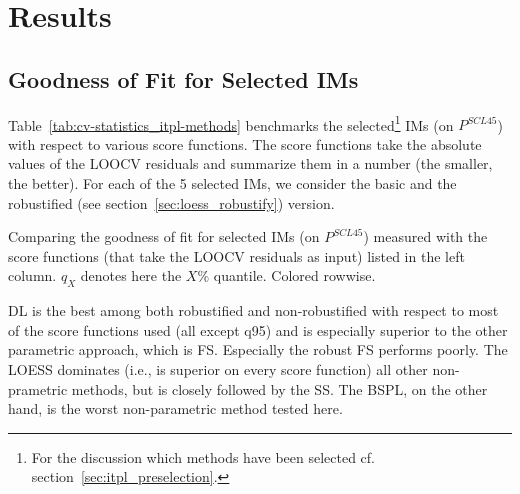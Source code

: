 \chapter{Results}\label{sec:results}

\section{Goodness of Fit for Selected {{IM}}s}{
	\label{sec:results_itpl}
	Table~\ref{tab:cv-statistics_itpl-methods} benchmarks the selected\footnote{\label{note:selected-IM} For the discussion which methods have been selected cf. section~\ref{sec:itpl_preselection}.} {{IM}}s (on $P^{SCL45}$) with respect to various score functions. The score functions take the absolute values of the LOOCV residuals and summarize them in a number (the smaller, the better). For each of the 5 selected {{IM}}s, we consider the basic and the robustified (see section~\ref{sec:loess_robustify}) version.

	\begin{table}[h]
		\begin{center}
			\caption[Goodness of fit for {{IM}}s (on $P^{SCL45}$) measured with the score functions.]{Comparing the goodness of fit for selected {{IM}}s (on $P^{SCL45}$) measured with the score functions (that take the LOOCV residuals as input) listed in the left column. $q_X$ denotes here the $X\%$ quantile. Colored rowwise.}
			\scriptsize
			
			\normalsize
			\label{tab:cv-statistics_itpl-methods}
		\end{center}
	\end{table}
	
	DL is the best among both robustified and non-robustified with respect to most of the score functions used (all except q95) and is especially superior to the other parametric approach, which is FS. Especially the robust FS performs poorly. The LOESS dominates (i.e., is superior on every score function) all other non-prametric methods, but is closely followed by the SS. The BSPL, on the other hand, is the worst non-parametric method tested here. 
}


